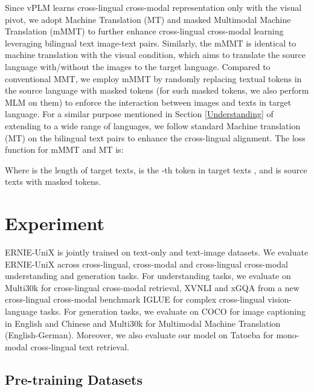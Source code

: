 \documentclass{article}
\begin{document}
Since vPLM learns cross-lingual cross-modal representation only with the visual pivot, we adopt Machine Translation (MT) and masked Multimodal Machine Translation (mMMT) to further enhance cross-lingual cross-modal learning leveraging bilingual text image-text pairs. Similarly, the mMMT is identical to machine translation with the visual condition, which aims to translate the source language with/without the images to the target language. Compared to conventional MMT, we employ mMMT by randomly replacing textual tokens in the source language with masked tokens (for such masked tokens, we also perform MLM on them) to enforce the interaction between images and texts in target language. For a similar purpose mentioned in Section \ref{Understanding} of extending to a wide range of languages, we follow standard Machine translation (MT) on the bilingual text pairs  to enhance the cross-lingual alignment. The loss function for mMMT and MT is:




Where  is the length of target texts,  is the -th token in target texts , and  is source texts with masked tokens.

\section{Experiment}
ERNIE-UniX is jointly trained on text-only and text-image datasets. We evaluate ERNIE-UniX across cross-lingual, cross-modal and cross-lingual cross-modal understanding and generation tasks. For understanding tasks,
 we evaluate on Multi30k \cite{elliott-etal-2016-multi30k} for cross-lingual cross-modal retrieval, XVNLI \cite{xvnli-lingual} and xGQA \cite{xGQA2021} from a new cross-lingual cross-modal benchmark IGLUE \cite{iglue2022} for complex cross-lingual vision-language tasks. For generation tasks, we evaluate on COCO \cite{mscoco,cococn} for image captioning in English and Chinese and Multi30k \cite{elliott-etal-2016-multi30k} for Multimodal Machine Translation (English-German). Moreover, we also evaluate our model on Tatoeba \cite{tatoeba} for mono-modal cross-lingual text retrieval.
 
\subsection{Pre-training Datasets}
\end{document}
